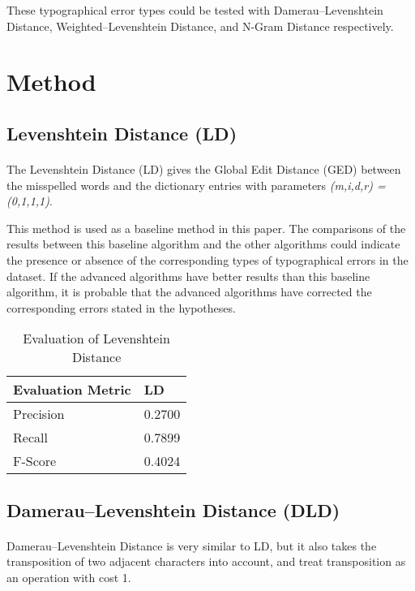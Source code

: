 \documentclass[11pt]{article}
\begin{document}
These typographical error types could be tested with Damerau–Levenshtein Distance, Weighted–Levenshtein Distance, and N-Gram Distance respectively.

\section{Method}

\subsection{Levenshtein Distance (LD)}
\paragraph{} The Levenshtein Distance (LD) gives the Global Edit Distance (GED) between the misspelled words and the dictionary entries with parameters \textit{(m,i,d,r) = (0,1,1,1)}. 

This method is used as a baseline method in this paper. The comparisons of the results between this baseline algorithm and the other algorithms could indicate the presence or absence of the corresponding types of typographical errors in the dataset. If the advanced algorithms have better results than this baseline algorithm, it is probable that the advanced algorithms have corrected the corresponding errors stated in the hypotheses.

\begin{table}[!htbp]
 \begin{center}
\begin{tabular}{| l | l |}

      \hline
      Evaluation Metric & LD \\
      \hline\hline
      Precision & 0.2700 \\
      Recall & 0.7899 \\
      F-Score & 0.4024 \\
      \hline

\end{tabular}
\caption{Evaluation of Levenshtein Distance}\label{table2}
 \end{center}
\end{table}


\subsection{Damerau–Levenshtein Distance (DLD)}

\paragraph{} Damerau–Levenshtein Distance is very similar to LD, but it also takes the transposition of two adjacent characters into account, and treat transposition as an operation with cost 1.
\end{document}
